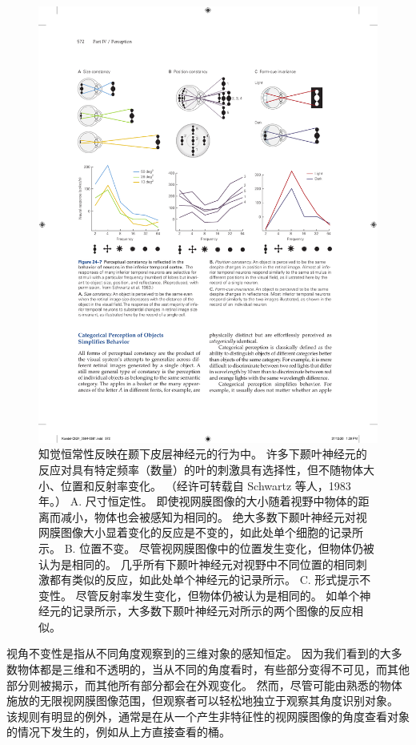 \begin{figure}[htbp]
	\centering
	\includegraphics[width=0.9\linewidth]{chap24/fig_24_7}
	\caption{知觉恒常性反映在颞下皮层神经元的行为中。 许多下颞叶神经元的反应对具有特定频率（数量）的叶的刺激具有选择性，但不随物体大小、位置和反射率变化。 （经许可转载自 Schwartz 等人，1983 年。） A. 尺寸恒定性。 即使视网膜图像的大小随着视野中物体的距离而减小，物体也会被感知为相同的。 绝大多数下颞叶神经元对视网膜图像大小显着变化的反应是不变的，如此处单个细胞的记录所示。 B. 位置不变。 尽管视网膜图像中的位置发生变化，但物体仍被认为是相同的。 几乎所有下颞叶神经元对视野中不同位置的相同刺激都有类似的反应，如此处单个神经元的记录所示。 C. 形式提示不变性。 尽管反射率发生变化，但物体仍被认为是相同的。 如单个神经元的记录所示，大多数下颞叶神经元对所示的两个图像的反应相似。}
	\label{fig:24_7}
\end{figure}

视角不变性是指从不同角度观察到的三维对象的感知恒定。
因为我们看到的大多数物体都是三维和不透明的，当从不同的角度看时，有些部分变得不可见，而其他部分则被揭示，而其他所有部分都会在外观变化。
然而，尽管可能由熟悉的物体施放的无限视网膜图像范围，但观察者可以轻松地独立于观察其角度识别对象。 
该规则有明显的例外，通常是在从一个产生非特征性的视网膜图像的角度查看对象的情况下发生的，例如从上方直接查看的桶。


